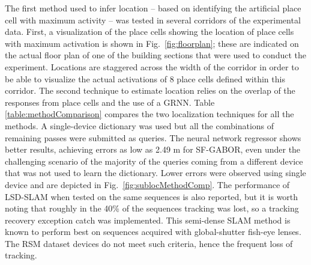The first method used to infer location -- based on identifying the artificial place cell with maximum activity -- was tested in several corridors of the experimental data.  First, a visualization of the place cells showing the location of place cells with maximum activation is shown in Fig.~\ref{fig:floorplan}; these are indicated on the actual floor plan of one of the building sections that were used to conduct the experiment.  Locations are staggered across the width of the corridor in order to be able to visualize the actual activations of 8 place cells defined within this corridor. The second technique to estimate location relies on the overlap of the responses from place cells and the use of a GRNN. Table \ref{table:methodComparison} compares the two localization techniques for all the methods. A single-device dictionary was used but all the combinations of remaining passes were submitted as queries. The neural network regressor shows better results, achieving errors as low as 2.49 m for SF-GABOR, even under the challenging scenario of the majority of the queries coming from a different device that was not used to learn the dictionary. Lower errors were observed using single device and are depicted in Fig.~\ref{fig:sublocMethodComp}. The performance of LSD-SLAM when tested on the same sequences is also reported, but it is worth noting that roughly in the 40\% of the sequences tracking was lost, so a tracking recovery exception catch was implemented. This  semi-dense SLAM method is known to perform best on sequences acquired with global-shutter fish-eye lenses. The RSM dataset devices do not meet such criteria, hence the frequent loss of tracking.

